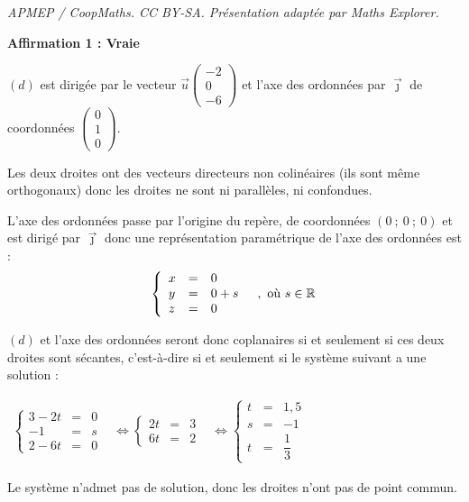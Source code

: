 \documentclass[10pt]{article}
\providecommand{\R}{\mathbb{R}}
\providecommand{\vect}[1]{\overrightarrow{#1}}
\begin{document}
\noindent\textit{APMEP / CoopMaths. CC BY-SA. Présentation adaptée par Maths Explorer.}\par\medskip
\medskip

\textbf{Affirmation 1 : Vraie}

$(d)$ est dirigée par le vecteur $\vect{u}\begin{pmatrix}-2\\0\\-6\end{pmatrix}$ et l'axe des ordonnées par $\vect{\jmath}$ de coordonnées $\begin{pmatrix} 0\\1\\0\end{pmatrix}$.

Les deux droites ont des vecteurs directeurs non colinéaires (ils sont même orthogonaux) donc les droites ne sont ni parallèles, ni confondues.

L'axe des ordonnées passe par l'origine du repère, de coordonnées $(0~;~0~;~0)$ et est dirigé par $\vect{\jmath}$ donc une représentation paramétrique de l'axe des ordonnées est :
\[\left\{\begin{array}{l c l}
x&=&0 \\
y&=&0 + s \\
z&=&0
\end{array} \quad, \text { où } s \in \R\right.\]

$(d)$ et l'axe des ordonnées seront donc coplanaires si et seulement si ces deux droites sont sécantes, c'est-à-dire si et seulement si le système suivant a une solution :

$\begin{aligned}
\left\{\begin{array}{lcl}
3-2t&=&0 \\
-1&=&s\\
2-6t&=&0
\end{array}\right.
	&\iff
\left\{\begin{array}{lcl}
2t&=&3 \\
6t&=&2
\end{array}\right.
	&\iff
\left\{\begin{array}{lcl}
t&=&1,5 \\
s&=&-1\\
t&=&\dfrac{1}{3}
\end{array}\right.
\end{aligned}$

Le système n'admet pas de solution, donc les droites n'ont pas de point commun.
\end{document}
